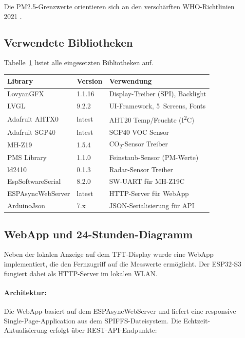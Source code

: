 Die PM2.5-Grenzwerte orientieren sich an den verschärften WHO-Richtlinien 2021 \autocite{WHO.2021}.

\subsection{Verwendete Bibliotheken}

Tabelle~\ref{tab:libs} listet alle eingesetzten Bibliotheken auf.

\begin{table}[htb]
\centering
\renewcommand{\arraystretch}{1.3}
\label{tab:libs}
\begin{tabular}{l l p{5.5cm}}
\toprule
\rowcolor{tableheader}
\textbf{Library} & \textbf{Version} & \textbf{Verwendung} \\
\midrule
LovyanGFX & 1.1.16 & Display-Treiber (SPI), Backlight \\
LVGL & 9.2.2 & UI-Framework, 5~Screens, Fonts \\
Adafruit AHTX0 & latest & AHT20 Temp/Feuchte (I\textsuperscript{2}C) \\
Adafruit SGP40 & latest & SGP40 VOC-Sensor \\
MH-Z19 & 1.5.4 & CO\textsubscript{2}-Sensor Treiber \\
PMS Library & 1.1.0 & Feinstaub-Sensor (PM-Werte) \\
ld2410 & 0.1.3 & Radar-Sensor Treiber \\
EspSoftwareSerial & 8.2.0 & SW-UART für MH-Z19C \\
ESPAsyncWebServer & latest & HTTP-Server für WebApp \\
ArduinoJson & 7.x & JSON-Serialisierung für API \\
\bottomrule
\end{tabular}
\end{table}

\subsection{WebApp und 24-Stunden-Diagramm}

Neben der lokalen Anzeige auf dem TFT-Display wurde eine WebApp implementiert, die den Fernzugriff auf die Messwerte ermöglicht. Der ESP32-S3 fungiert dabei als HTTP-Server im lokalen WLAN.

\paragraph{Architektur:}
Die WebApp basiert auf dem ESPAsyncWebServer und liefert eine responsive Single-Page-Application aus dem SPIFFS-Dateisystem. Die Echtzeit-Aktualisierung erfolgt über REST-API-Endpunkte:

